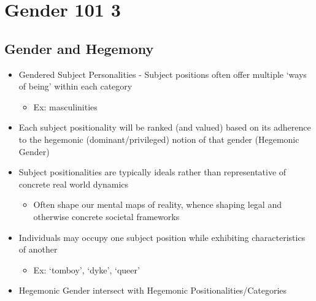 \documentclass[a4paper]{article}
\begin{document}
\setcounter{section}{11} %
\section{Gender 101 3}
\subsection{Gender and Hegemony}
\begin{itemize}
  \item Gendered Subject Personalities - Subject positions often offer multiple `ways of being' within each category \begin{itemize}
    \item Ex: masculinities
  \end{itemize}
  \item Each subject positionality will be ranked (and valued) based on its adherence to the hegemonic (dominant/privileged) notion of that gender (Hegemonic Gender)
  \item Subject positionalities are typically ideals rather than representative of concrete real world dynamics \begin{itemize}
    \item Often shape our mental maps of reality, whence shaping legal and otherwise concrete societal frameworks
  \end{itemize}
  \item Individuals may occupy one subject position while exhibiting characteristics of another \begin{itemize}
    \item Ex: `tomboy', `dyke', `queer'
  \end{itemize}
  \item Hegemonic Gender intersect with Hegemonic Positionalities/Categories
\end{itemize}
\end{document}
